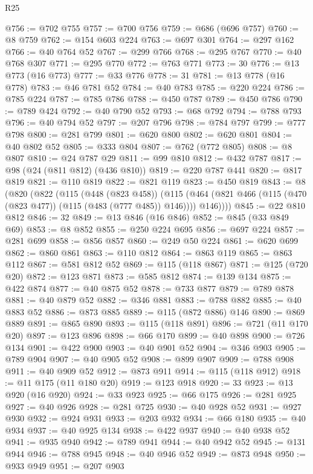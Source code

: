 \begin{lexlean}{R25}
\begin{coremodule}
{{{{{{{{{{{{{{{{{{{{{{{{{{{{{{{{{{{{{{{{{{{{{{{{{{{{{@756 := @702 @755
@757 := @700 @756
@759 := @686 (@696 @757)
@760 := @8 @759
@762 := @154 @603 @224
@763 := @697 @301
@764 := @297 @162
@766 := @40 @764 @52
@767 := @299 @766
@768 := @295 @767
@770 := @40 @768 @307
@771 := @295 @770
@772 := @763 @771
@773 := 30
@776 := @13 @773 (@16 @773)
@777 := @33 @776
@778 := 31
@781 := @13 @778 (@16 @778)
@783 := @46 @781 @52
@784 := @40 @783
@785 := @220 @224
@786 := @785 @224
@787 := @785 @786
@788 := @450 @787
@789 := @450 @786
@790 := @789 @424
@792 := @40 @790 @52
@793 := @68 @792
@794 := @788 @793
@796 := @40 @794 @52
@797 := @207 @796
@798 := @784 @797
@799 := @777 @798
@800 := @281 @799
@801 := @620 @800
@802 := @620 @801
@804 := @40 @802 @52
@805 := @333 @804
@807 := @762 (@772 @805)
@808 := @8 @807
@810 := @24 @787 @29
@811 := @99 @810
@812 := @432 @787
@817 := @98 (@24 (@811 @812) (@436 @810))
@819 := @220 @787 @441
@820 := @817 @819
@821 := @110 @819
@822 := @821 @119
@823 := @450 @819
@843 := @8
    (@820
      (@822
        (@115
          (@448 (@823 @458))
          (@115 (@464 (@821 @466 (@115 (@470 (@823 @477)) (@115 (@483 (@777 @485)) @146)))) @146))))
@845 := @22 @810 @812
@846 := 32
@849 := @13 @846 (@16 @846)
@852 := @845 (@33 @849 @69)
@853 := @8 @852
@855 := @250 @224 @695
@856 := @697 @224
@857 := @281 @699
@858 := @856 @857
@860 := @249 @50 @224
@861 := @620 @699
@862 := @860 @861
@863 := @110 @812
@864 := @863 @119
@865 := @863 @112
@867 := @581 @812 @52
@869 := @115 (@118 @867)
@871 := @125 (@720 @20)
@872 := @123 @871
@873 := @585 @812
@874 := @139 @134
@875 := @422 @874
@877 := @40 @875 @52
@878 := @733 @877
@879 := @789 @878
@881 := @40 @879 @52
@882 := @346 @881
@883 := @788 @882
@885 := @40 @883 @52
@886 := @873 @885
@889 := @115 (@872 @886) @146
@890 := @869 @889
@891 := @865 @890
@893 := @115 (@118 @891)
@896 := @721 (@11 @170 @20)
@897 := @123 @896
@898 := @66 @170
@899 := @40 @898
@900 := @726 @134
@901 := @422 @900
@903 := @40 @901 @52
@904 := @346 @903
@905 := @789 @904
@907 := @40 @905 @52
@908 := @899 @907
@909 := @788 @908
@911 := @40 @909 @52
@912 := @873 @911
@914 := @115 (@118 @912)
@918 := @11 @175 (@11 @180 @20)
@919 := @123 @918
@920 := 33
@923 := @13 @920 (@16 @920)
@924 := @33 @923
@925 := @66 @175
@926 := @281 @925
@927 := @40 @926
@928 := @281 @725
@930 := @40 @928 @52
@931 := @927 @930
@932 := @924 @931
@933 := @203 @932
@934 := @66 @180
@935 := @40 @934
@937 := @40 @925 @134
@938 := @422 @937
@940 := @40 @938 @52
@941 := @935 @940
@942 := @789 @941
@944 := @40 @942 @52
@945 := @131 @944
@946 := @788 @945
@948 := @40 @946 @52
@949 := @873 @948
@950 := @933 @949
@951 := @207 @903
}}}}}}}}}}}}}}}}}}}}}}}}}}}}}}}}}}}}}}}}}}}}}}}}}}}}}
\end{coremodule}
\end{lexlean}
